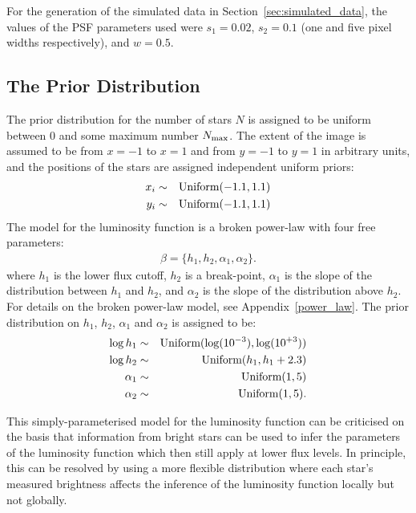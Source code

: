 \documentclass[letterpaper, 11pt]{article}
\begin{document}
For the generation of the simulated data in Section~\ref{sec:simulated_data},
the values of the PSF parameters used were $s_1=0.02$, $s_2=0.1$ (one and
five pixel widths respectively), and $w=0.5$.

\subsection{The Prior Distribution}
The prior distribution for the number of stars $N$ is assigned to be uniform between 0 and
some maximum number $N_{\rm max}$. The extent of the image is assumed to be
from $x=-1$ to $x=1$ and from $y=-1$ to $y=1$ in arbitrary units, and the
positions of the stars are assigned independent uniform priors:
\begin{eqnarray}
x_i &\sim& \textnormal{Uniform}(-1.1, 1.1) \\
y_i &\sim& \textnormal{Uniform}(-1.1, 1.1) \\
\end{eqnarray}
The model for the luminosity function is a broken power-law with four
free parameters:
\begin{eqnarray}
\beta = \{h_1, h_2, \alpha_1, \alpha_2\}.
\end{eqnarray}
where $h_1$ is the lower flux cutoff, $h_2$ is a break-point, $\alpha_1$ is
the slope of the distribution between $h_1$ and $h_2$, and $\alpha_2$ is the
slope of the distribution above $h_2$. For details on the broken power-law
model, see Appendix~\ref{power_law}. The prior distribution on $h_1$, $h_2$,
$\alpha_1$ and $\alpha_2$ is assigned to be:
\begin{eqnarray}
\log h_1 &\sim& \textnormal{Uniform}(\log(10^{-3}), \log(10^{+3})) \\
\log h_2 &\sim& \textnormal{Uniform}(h_1, h_1 + 2.3) \\
\alpha_1 &\sim& \textnormal{Uniform}(1, 5) \\
\alpha_2 &\sim& \textnormal{Uniform}(1, 5).
\end{eqnarray}

This simply-parameterised model for the luminosity function can be criticised
on the basis that information from bright stars can be used to infer the
parameters of the luminosity function which then still apply at lower flux
levels. In principle, this can be resolved by using a more flexible distribution
\citep[e.g.][]{2008ApJ...682..874K} where each star's measured brightness
affects the inference of the luminosity function locally but not globally.
\end{document}

